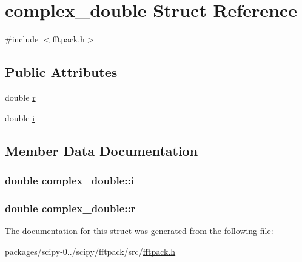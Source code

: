 \hypertarget{structcomplex__double}{}\section{complex\+\_\+double Struct Reference}
\label{structcomplex__double}


{\ttfamily \#include $<$fftpack.\+h$>$}

\subsection*{Public Attributes}
\begin{DoxyCompactItemize}
\item 
double \hyperlink{structcomplex__double_ad0beb1942be0ce0fef8132d06aa86a0b}{r}
\item 
double \hyperlink{structcomplex__double_a722ec23045b0ccfc9c51317169c47533}{i}
\end{DoxyCompactItemize}


\subsection{Member Data Documentation}
\hypertarget{structcomplex__double_a722ec23045b0ccfc9c51317169c47533}{}
\subsubsection[{i}]{\setlength{\rightskip}{0pt plus 5cm}double complex\+\_\+double\+::i}\label{structcomplex__double_a722ec23045b0ccfc9c51317169c47533}
\hypertarget{structcomplex__double_ad0beb1942be0ce0fef8132d06aa86a0b}{}
\subsubsection[{r}]{\setlength{\rightskip}{0pt plus 5cm}double complex\+\_\+double\+::r}\label{structcomplex__double_ad0beb1942be0ce0fef8132d06aa86a0b}


The documentation for this struct was generated from the following file\+:\begin{DoxyCompactItemize}
\item 
packages/scipy-\/0../scipy/fftpack/src/\hyperlink{fftpack_8h}{fftpack.\+h}\end{DoxyCompactItemize}
